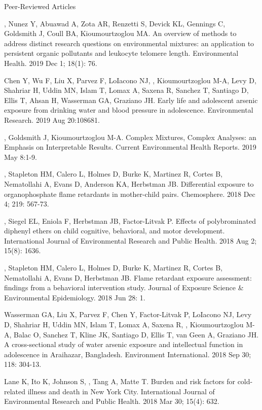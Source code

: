 \documentclass[a4paper,10pt]{article}
\newlength{\cvcolumngapwidth}
\newlength{\cvleftcolumnwidth}
\newlength{\cvrightcolumnwidth}
\newcommand{\cvdurationstyle}[1]{{\small\cvdurationfont\textcolor{cvdurationcolor}{#1}}}
\newlength{\cvafteritemskipamount}
\newlength{\cvparskip}
\newcommand{\cvitem}[2]{
    \begin{minipage}[t]{\cvleftcolumnwidth}
        \raggedleft #1
    \end{minipage}%
    \hspace{\cvcolumngapwidth}%
    \begin{minipage}[t]{\cvrightcolumnwidth}
        \setlength{\parskip}{\cvparskip} #2
    \end{minipage}

    \vspace{\cvafteritemskipamount}
}
\begin{document}
\cvitem{
    \cvdurationstyle{Peer-Reviewed Articles}
}{  
    \begin{etaremune}
    	\item {\cvnamefont{Gibson EA}}, Nunez Y, Abuawad A, Zota AR, Renzetti S, Devick KL, Gennings C, Goldsmith J, Coull BA, Kioumourtzoglou MA. An overview of methods to address distinct research questions on environmental mixtures: an application to persistent organic pollutants and leukocyte telomere length. Environmental Health. 2019 Dec 1; 18(1): 76. 
	\item Chen Y, Wu F, Liu X, Parvez F, LoIacono NJ, {\cvnamefont{Gibson EA}}, Kioumourtzoglou M-A, Levy D, Shahriar H, Uddin MN, Islam T, Lomax A, Saxena R, Sanchez T, Santiago D, Ellis T, Ahsan H, Wasserman GA, Graziano JH. Early life and adolescent arsenic exposure from drinking water and blood pressure in adolescence. Environmental Research. 2019 Aug 20:108681.	
	\item {\cvnamefont{Gibson EA}}, Goldsmith J, Kioumourtzoglou M-A. Complex Mixtures, Complex Analyses: an Emphasis on Interpretable Results. Current Environmental Health Reports. 2019 May 8:1-9. \\
	\item {\cvnamefont{Gibson EA}}, Stapleton HM, Calero L, Holmes D, Burke K, Martinez R, Cortes B, Nematollahi A, Evans D, Anderson KA, Herbstman JB. Differential exposure to organophosphate flame retardants in mother-child pairs. Chemosphere. 2018 Dec 4; 219: 567-73. 
	\item {\cvnamefont{Gibson EA}}, Siegel EL, Eniola F, Herbstman JB, Factor-Litvak P. Effects of polybrominated diphenyl ethers on child cognitive, behavioral, and motor development. International Journal of Environmental Research and Public Health. 2018 Aug 2; 15(8): 1636. 
	\item {\cvnamefont{Gibson EA}}, Stapleton HM, Calero L, Holmes D, Burke K, Martinez R, Cortes B, Nematollahi A, Evans D, Herbstman JB. Flame retardant exposure assessment: findings from a behavioral intervention study. Journal of Exposure Science \& Environmental Epidemiology. 2018 Jun 28: 1. 
	\item Wasserman GA, Liu X, Parvez F, Chen Y, Factor-Litvak P, LoIacono NJ, Levy D, Shahriar H, Uddin MN, Islam T, Lomax A, Saxena R, {\cvnamefont{Gibson EA}}, Kioumourtzoglou M-A, Balac O, Sanchez T, Kline JK, Santiago D, Ellis T, van Geen A, Graziano JH. A cross-sectional study of water arsenic exposure and intellectual function in adolescence in Araihazar, Bangladesh. Environment International. 2018 Sep 30; 118: 304-13.
	\item Lane K, Ito K, Johnson S, {\cvnamefont{Gibson EA}}, Tang A, Matte T. Burden and risk factors for cold-related illness and death in New York City. International Journal of Environmental Research and Public Health. 2018 Mar 30; 15(4): 632. 
    \end{etaremune}
}
\end{document}
